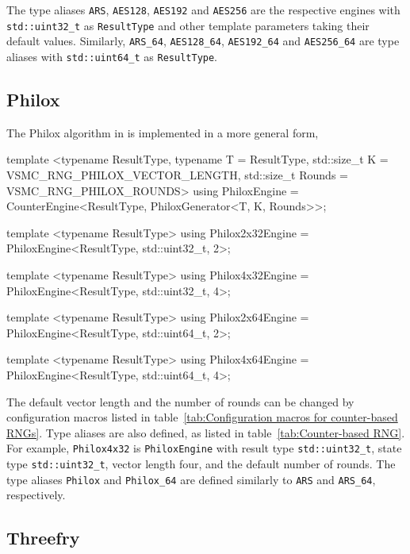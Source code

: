 The type aliases \verb|ARS|, \verb|AES128|, \verb|AES192| and \verb|AES256| are
the respective engines with \verb|std::uint32_t| as \verb|ResultType| and other
template parameters taking their default values. Similarly, \verb|ARS_64|,
\verb|AES128_64|, \verb|AES192_64| and \verb|AES256_64| are type aliases with
\verb|std::uint64_t| as \verb|ResultType|.

\subsection{Philox}
\label{sub:Philox}

The Philox algorithm in \textcite{Salmon:2011um} is implemented in a more
general form,
\begin{cppcode}
  template <typename ResultType, typename T = ResultType,
      std::size_t K = VSMC_RNG_PHILOX_VECTOR_LENGTH,
      std::size_t Rounds = VSMC_RNG_PHILOX_ROUNDS>
  using PhiloxEngine = CounterEngine<ResultType, PhiloxGenerator<T, K, Rounds>>;

  template <typename ResultType>
  using Philox2x32Engine = PhiloxEngine<ResultType, std::uint32_t, 2>;

  template <typename ResultType>
  using Philox4x32Engine = PhiloxEngine<ResultType, std::uint32_t, 4>;

  template <typename ResultType>
  using Philox2x64Engine = PhiloxEngine<ResultType, std::uint64_t, 2>;

  template <typename ResultType>
  using Philox4x64Engine = PhiloxEngine<ResultType, std::uint64_t, 4>;
\end{cppcode}
The default vector length and the number of rounds can be changed by
configuration macros listed in table~\ref{tab:Configuration macros for
  counter-based RNGs}. Type aliases are also defined, as listed in
table~\ref{tab:Counter-based RNG}. For example, \verb|Philox4x32| is
\verb|PhiloxEngine| with result type \verb|std::uint32_t|, state type
\verb|std::uint32_t|, vector length four, and the default number of rounds. The
type aliases \verb|Philox| and \verb|Philox_64| are defined similarly to
\verb|ARS| and \verb|ARS_64|, respectively.

\subsection{Threefry}
\label{sub:Threefry}

